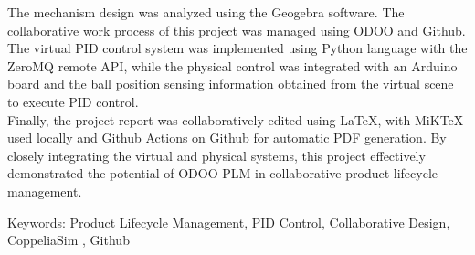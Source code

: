 \justifying\fontsize{14pt}{16pt}\sectionef\hspace{12pt}\quad The mechanism design was analyzed using the Geogebra software. The collaborative work process of this project was managed using ODOO and Github. The virtual PID control system was implemented using Python language with the ZeroMQ remote API, while the physical control was integrated with an Arduino board and the ball position sensing information obtained from the virtual scene to execute PID control.\\

\justifying\fontsize{14pt}{16pt}\sectionef\hspace{12pt}\quad Finally, the project report was collaboratively edited using LaTeX, with MiKTeX used locally and Github Actions on Github for automatic PDF generation. By closely integrating the virtual and physical systems, this project effectively demonstrated the potential of ODOO PLM in collaborative product lifecycle management.\\

\begin{hangparas}{1.5cm}{1}
Keywords: Product Lifecycle Management, PID Control, Collaborative Design, CoppeliaSim , Github
\end{hangparas}



